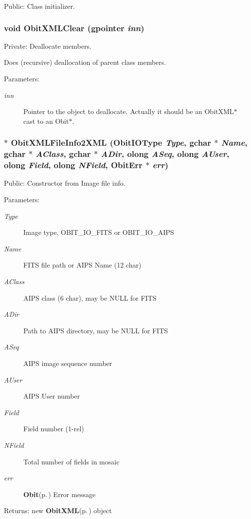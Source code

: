 Public: Class initializer. 

\subsubsection{\setlength{\rightskip}{0pt plus 5cm}void Obit\-XMLClear (gpointer {\em inn})}\label{ObitXML_8c_a4}


Private: Deallocate members. 

Does (recursive) deallocation of parent class members. \begin{Desc}
\item[Parameters:]
\begin{description}
\item[{\em inn}]Pointer to the object to deallocate. Actually it should be an Obit\-XML$\ast$ cast to an Obit$\ast$. \end{description}
\end{Desc}
\subsubsection{$\ast$ Obit\-XMLFile\-Info2XML (Obit\-IOType {\em Type}, gchar $\ast$ {\em Name}, gchar $\ast$ {\em AClass}, gchar $\ast$ {\em ADir}, {\bf olong} {\em ASeq}, {\bf olong} {\em AUser}, {\bf olong} {\em Field}, {\bf olong} {\em NField}, {\bf Obit\-Err} $\ast$ {\em err})}\label{ObitXML_8c_a19}


Public: Constructor from Image file info. 

\begin{Desc}
\item[Parameters:]
\begin{description}
\item[{\em Type}]Image type, OBIT\_\-IO\_\-FITS or OBIT\_\-IO\_\-AIPS \item[{\em Name}]FITS file path or AIPS Name (12 char) \item[{\em AClass}]AIPS class (6 char), may be NULL for FITS \item[{\em ADir}]Path to AIPS directory, may be NULL for FITS \item[{\em ASeq}]AIPS image sequence number \item[{\em AUser}]AIPS User number \item[{\em Field}]Field number (1-rel) \item[{\em NField}]Total number of fields in mosaic \item[{\em err}]{\bf Obit}{\rm (p.\,\pageref{structObit})} Error message \end{description}
\end{Desc}
\begin{Desc}
\item[Returns:]new {\bf Obit\-XML}{\rm (p.\,\pageref{structObitXML})} object \end{Desc}
